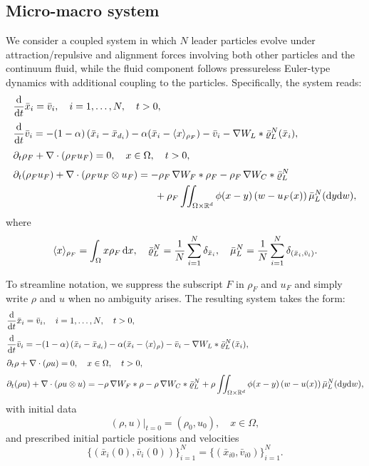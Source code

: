 \documentclass[10pt, reqno]{amsart}
\theoremstyle{definition}
\theoremstyle{remark}
\numberwithin{equation}{section}
\newcommand{\dx}{\textnormal{d}x}
\newcommand{\dy}{\textnormal{d}y}
\newcommand{\dw}{\textnormal{d}w}
\newcommand{\ddt}{\frac{\textnormal{d}}{\textnormal{d}t}}
\begin{document}
\subsection{Micro-macro system}
We consider a coupled system in which $N$ leader particles evolve under attraction/repulsive and alignment forces involving both other particles and the continuum fluid, while the fluid component follows pressureless Euler-type dynamics with additional coupling to the particles. Specifically, the system reads:
\begin{align}\label{pf_main}
\begin{aligned}
    &\ddt \bar{x}_i = \bar{v}_i, \quad i = 1,\dots, N, \quad t > 0,\\[1mm]
    &\ddt \bar{v}_i = -(1-\alpha)\left(\bar{x}_i - \bar x_{d_i} \right) -\alpha (\bar{x}_i - \langle x \rangle_{\rho_F} ) - \bar{v}_i - \nabla W_L *   \bar\varrho_{L}^N(\bar{x}_i),\\[1mm]
    &\partial_t \rho_F + \nabla \cdot (\rho_F u_F) = 0, \quad x\in \Omega, \quad t > 0,\\[1mm]
    &\partial_t (\rho_F u_F) + \nabla \cdot (\rho_F u_F\otimes u_F) = -\rho_F\, \nabla W_F * \rho_F - \rho_F\, \nabla W_C *   \bar\varrho_{L}^N \\
    &\hspace{5cm} + \rho_F \iint_{\Omega \times\mathbb{R}^d} \phi(x-y)\,(w - u_F(x))\,\bar\mu_L^N(\dy\dw),
\end{aligned}
\end{align}
where 
\[
\langle x \rangle_{\rho_F} = \int_{\Omega} x \rho_F \,\dx, \quad  \bar\varrho_L^{N} = \frac1N \sum_{i=1}^N \delta_{\bar{x}_i}, 
\quad \bar\mu_L^{N} = \frac1N \sum_{i=1}^N \delta_{(\bar{x}_i, \bar v_i)}.
\]

To streamline notation, we suppress the subscript $F$ in $\rho_F$ and $u_F$ and simply write $\rho$ and $u$ when no ambiguity arises. The resulting system takes the form:
\begin{align}\label{fluid}
\begin{aligned}
    &\ddt \bar{x}_i = \bar{v}_i, \quad i = 1,\dots, N, \quad t > 0,\\[1mm]
    &\ddt \bar{v}_i = -(1-\alpha)\left(\bar{x}_i - \bar x_{d_i} \right) -\alpha (\bar{x}_i - \langle x \rangle_{\rho} ) - \bar{v}_i - \nabla W_L *   \bar\varrho_{L}^N(\bar{x}_i),\\[1mm]
    &\partial_t \rho + \nabla \cdot (\rho u) = 0, \quad x\in \Omega, \quad t > 0,\\[1mm]
    &\partial_t (\rho u) + \nabla \cdot (\rho u\otimes u) = -\rho\, \nabla W_F * \rho - \rho\, \nabla W_C * \bar\varrho_{L}^N  + \rho \iint_{\Omega \times\mathbb{R}^d } \phi(x-y)\,(w-u(x))\,\bar\mu_L^N(\dy\dw),
\end{aligned}
\end{align}
with initial data
\[
(\rho,u)|_{t=0} = (\rho_0,u_0), \quad x \in \Omega,
\]
and prescribed initial particle positions and velocities
\[
\{ (\bar{x}_i(0),\bar{v}_i(0))\}_{i=1}^N = \{ (\bar{x}_{i0},\bar{v}_{i0})\}_{i=1}^N.
\]
\end{document}
